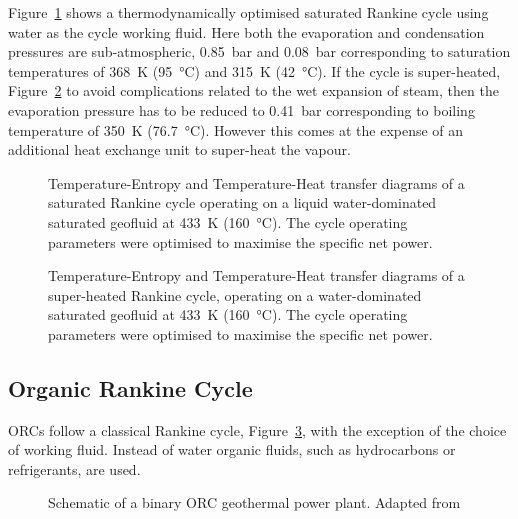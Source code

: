         Figure~\ref{fig:litrev_Rankine_TS} shows a thermodynamically optimised saturated Rankine cycle using water as the cycle working fluid. Here both the evaporation and condensation pressures are sub-atmospheric, \qty{0.85}{\bar} and \qty{0.08}{\bar} corresponding to saturation temperatures of \qty{368}{\K} (\qty{95}{\degreeCelsius}) and \qty{315}{\K} (\qty{42}{\degreeCelsius}). If the cycle is super-heated, Figure~\ref{fig:litrev_RankineSuperHeat_TS} to avoid complications related to the wet expansion of steam, then the evaporation pressure has to be reduced to \qty{0.41}{\bar} corresponding to boiling temperature of \qty{350}{\K} (\qty{76.7}{\degreeCelsius}). However this comes at the expense of an additional heat exchange unit to super-heat the vapour.

         \begin{figure}[H]
            \centering
            
            \caption[TS and TQ diagrams of a saturated Rankine cycle.]{Temperature-Entropy and Temperature-Heat transfer diagrams of a saturated Rankine cycle operating on a liquid water-dominated saturated geofluid at \qty{433}{\K} (\qty{160}{\degreeCelsius}). The cycle operating parameters were optimised to maximise the specific net power.}
            \label{fig:litrev_Rankine_TS}
        \end{figure}

        \begin{figure}[H]
            \centering
            
            \caption[TS and TQ diagrams of a super-heated Rankine cycle.]{Temperature-Entropy and Temperature-Heat transfer diagrams of a super-heated Rankine cycle, operating on a water-dominated saturated geofluid at \qty{433}{\K} (\qty{160}{\degreeCelsius}). The cycle operating parameters were optimised to maximise the specific net power.}
            \label{fig:litrev_RankineSuperHeat_TS}
        \end{figure}
        

    \subsection{Organic Rankine Cycle}
        \acf{ORC}s follow a classical Rankine cycle, Figure~\ref{fig:litrev_ORC_schematic}, with the exception of the choice of working fluid. Instead of water organic fluids, such as hydrocarbons or refrigerants, are used. 

         \begin{figure}[H]
            \centering
            
            \caption{Schematic of a binary ORC geothermal power plant. Adapted from \cite{DiPippo2016}}
            \label{fig:litrev_ORC_schematic}
        \end{figure}
    
